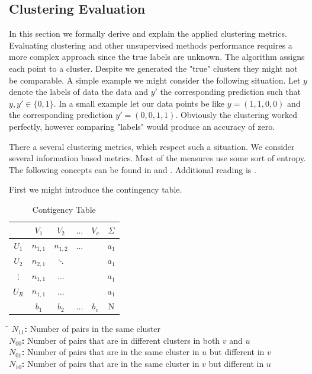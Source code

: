 \documentclass[12pt,a4paper,bibliography=totocnumbered,listof=totocnumbered]{scrartcl}
\begin{document}
{\begin{appendix}
\pagebreak

\section{Clustering Evaluation}
\label{sec:ce}
In this section we formally derive and explain the applied clustering metrics. Evaluating clustering and other unsupervised methods performance requires a more complex approach since the true labels are unknown. The algorithm assigns each point to a cluster. Despite we generated the "true" clusters they might not be comparable. A simple example we might consider the following situation. Let $y$ denote the labels of data the data and $y'$ the corresponding prediction such that  $y,y' \in \{0,1\}$. In a small example let our data points be like $y=(1,1,0,0)$ and the corresponding prediction $y'=(0,0,1,1)$. Obviously the clustering worked perfectly, however comparing "labels" would produce an accuracy of zero. 

There a several clustering metrics, which respect such a situation. We consider several information based metrics. Most of the measures use some sort of entropy. The following concepts can be found in \cite{Rosenberg2007} and  \cite{Vinh2010}. Additional reading is \cite{Hubert1985}. 

First we might introduce the contingency table. 

\setlength{\tabcolsep}{0.2cm}
\renewcommand{\arraystretch}{1}
\begin{table}[htb]
	\centering
	\begin{tabular}{c | c c c c| c}
		 & $V_1$ & $V_2$ & $\dots$ & $V_c$ & $\Sigma$ \\
		\hline
		$U_1$ & $n_{1,1}$ &$n_{1,2}$  &$\dots$ & & $a_1$ \\ 
		$U_2$ & $n_{2,1}$ & $\ddots$ & & & $a_1$ \\ 
		$\vdots$ & $n_{1,1}$ & $\dots$ & & & $a_1$ \\ 
		$U_R$ & $n_{1,1}$ & $\dots$ & & & $a_1$ \\ 
		\hline
		& $b_1$ & $b_2$ & $\dots$ & $b_c$ & N
	\end{tabular}
\caption{Contigency Table}
\end{table}

\begin{tabbing}
	\hspace*{1cm}\=\hspace*{1cm}\=\hspace*{3cm}\=\hspace*{2.7cm}\= \kill
	\onehalfspacing
	\textbf{$N_{11}$:} \>\> Number of pairs in the same cluster \\ 
	\textbf{$N_{00}$:} \>\> Number of pairs that are in different clusters in both $v$ and $u$ \\ 
	\textbf{$N_{01}$:} \>\> Number of pairs that are in the same cluster in $u$ but different in $v$ \\ 
	\textbf{$N_{10}$:} \>\>  Number of pairs that are in the same cluster in $v$ but different in $u$ \\ 
\end{tabbing}


\end{appendix}}
\end{document}
